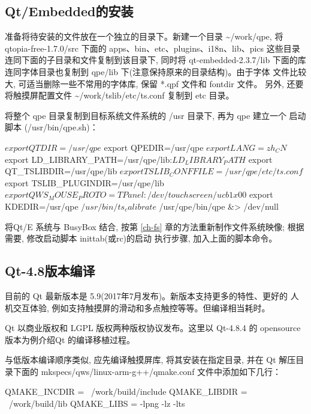 \subsection{Qt/Embedded的安装}
准备将待安装的文件放在一个独立的目录下。新建一个目录
\textasciitilde/work/qpe, 将
qtopia-free-1.7.0/src 下面的 apps、bin、etc、plugins、i18n、lib、pics
这些目录连同下面的子目录和文件复制到该目录下, 同时将 qt-embedded-2.3.7/lib
下面的库连同字体目录也复制到 qpe/lib 下(注意保持原来的目录结构)。由于字体
文件比较大, 可适当删除一些不常用的字体库, 保留 *.qpf 文件和 fontdir 文件。
另外, 还要将触摸屏配置文件 \textasciitilde/work/tslib/etc/ts.conf
复制到 etc 目录。

将整个 qpe 目录复制到目标系统文件系统的 /usr 目录下, 再为 qpe 建立一个
启动脚本 (/usr/bin/qpe.sh)：
\begin{blockcode} 
$ export QTDIR=/usr/qpe
$ export QPEDIR=/usr/qpe
$ export LANG=zh_CN
$ export LD_LIBRARY_PATH=/usr/qpe/lib:$LD_LIBRARY_PATH
$ export QT_TSLIBDIR=/usr/qpe/lib
$ export TSLIB_CONFFILE=/usr/qpe/etc/ts.conf
$ export TSLIB_PLUGINDIR=/usr/qpe/lib
$ export QWS_MOUSE_PROTO=TPanel:/dev/touchscreen/ucb1x00
$ export KDEDIR=/usr/qpe
$ /usr/bin/ts_calibrate
$ /usr/qpe/bin/qpe &> /dev/null
\end{blockcode}

将Qt/E 系统与 BusyBox 结合, 按第 \ref{ch-fs}
章的方法重新制作文件系统映像; 根据需要, 修改启动脚本 inittab(或rc)的启动
执行步骤, 加入上面的脚本命令。

\subsection{Qt-4.8版本编译}
目前的 Qt 最新版本是 5.9(2017年7月发布)。新版本支持更多的特性、更好的
人机交互体验, 例如支持触摸屏的滑动和多点触控等等。但编译相当耗时。

Qt 以商业版权和 LGPL 版权两种版权协议发布。这里以 Qt-4.8.4 的 opensource
版本为例介绍Qt 的编译移植过程。

与低版本编译顺序类似, 应先编译触摸屏库, 将其安装在指定目录, 并在 Qt
解压目录下面的 mkspecs/qws/linux-arm-g++/qmake.conf 文件中添加如下几行：
\begin{blockcode}
QMAKE_INCDIR    = ~/work/build/include
QMAKE_LIBDIR    = ~/work/build/lib
QMAKE_LIBS      = -lpng -lz -lts
\end{blockcode}


